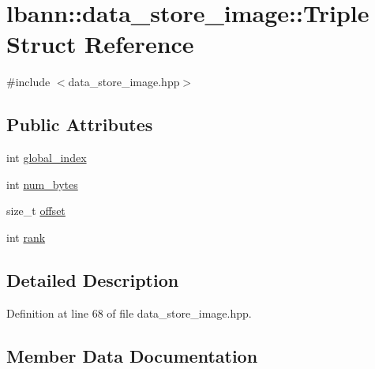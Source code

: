 \hypertarget{structlbann_1_1data__store__image_1_1Triple}{}\section{lbann\+:\+:data\+\_\+store\+\_\+image\+:\+:Triple Struct Reference}
\label{structlbann_1_1data__store__image_1_1Triple}


{\ttfamily \#include $<$data\+\_\+store\+\_\+image.\+hpp$>$}

\subsection*{Public Attributes}
\begin{DoxyCompactItemize}
\item 
int \hyperlink{structlbann_1_1data__store__image_1_1Triple_ab0272c98326490e8c32f78a06945532e}{global\+\_\+index}
\item 
int \hyperlink{structlbann_1_1data__store__image_1_1Triple_ac1433e36775425f7aad96c4679713a6a}{num\+\_\+bytes}
\item 
size\+\_\+t \hyperlink{structlbann_1_1data__store__image_1_1Triple_ac46e0207ffbcf36e5b68fc35fe96ddb6}{offset}
\item 
int \hyperlink{structlbann_1_1data__store__image_1_1Triple_a2e478c92a7be9cb64905867f4744bd9d}{rank}
\end{DoxyCompactItemize}


\subsection{Detailed Description}


Definition at line 68 of file data\+\_\+store\+\_\+image.\+hpp.



\subsection{Member Data Documentation}
\mbox{\label{structlbann_1_1data__store__image_1_1Triple_ab0272c98326490e8c32f78a06945532e}} 
